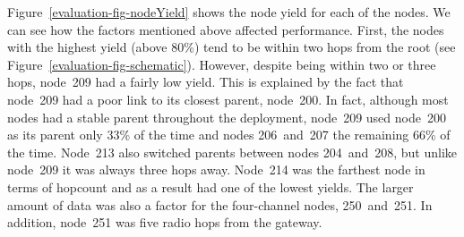 Figure~\ref{evaluation-fig-nodeYield} shows the node yield for each of the
nodes.
We can see how the factors mentioned above affected performance.  First, the
nodes with the highest yield (above 80\%) tend to be within two hops from the
root (see Figure~\ref{evaluation-fig-schematic}).  However, despite being
within two or three hops, node~209 had a fairly low yield.  This is explained
by the fact that node~209 had a poor link to its closest parent, node~200.
In fact, although most nodes had a stable parent throughout the deployment,
node~209 used node~200 as its parent only 33\% of the time and nodes
206~and~207 the remaining 66\% of the time.  Node~213 also switched parents
between nodes 204~and~208, but unlike node~209 it was always three hops away.
Node~214 was the farthest node in terms of hopcount and as a result had one
of the lowest yields.  The larger amount of data was also a factor for the
four-channel nodes, 250~and~251. In addition, node~251 was five radio hops
from the gateway.




